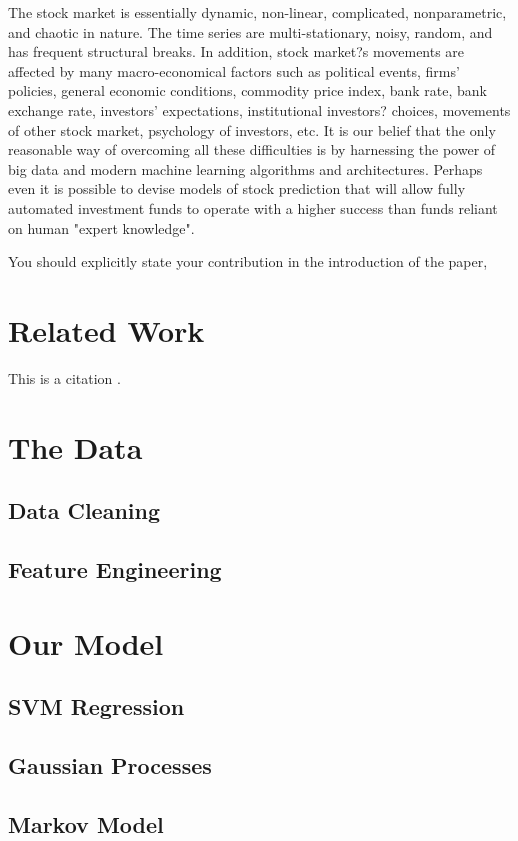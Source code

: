 \documentclass{article}
\def\blu#1{{\color{blu}#1}}
\begin{document}
The stock market is essentially dynamic, non-linear, complicated, nonparametric, and chaotic in nature. The time series are multi-stationary, noisy, random, and has frequent structural breaks. In addition, stock market?s movements are affected by many macro-economical factors such as political events, firms' policies, general economic conditions, commodity price index, bank rate, bank exchange rate, investors' expectations, institutional investors? choices, movements of other stock market, psychology of investors, etc. It is our belief that the only reasonable way of overcoming all these difficulties is by harnessing the power of big data and modern machine learning algorithms and architectures. Perhaps even it is possible to devise models of stock prediction that will allow fully automated investment funds to operate with a higher success than funds reliant on human "expert knowledge".

\blu{You should explicitly state your contribution in the introduction of the paper,}

\section{Related Work}

This is a citation \cite{vapnik1999overview}.

\section{The Data}
\subsection{Data Cleaning}
\subsection{Feature Engineering}

\section{Our Model}
\subsection{SVM Regression}
\subsection{Gaussian Processes}
\subsection{Markov Model}
\end{document}
